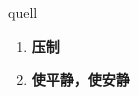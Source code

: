 
\begin{frame}
{\huge quell}
\begin{center}
\begin{enumerate}\Large
  \item \textbf{压制}
  \item \textbf{使平静，使安静}
\end{enumerate}
\end{center}
\end{frame}
